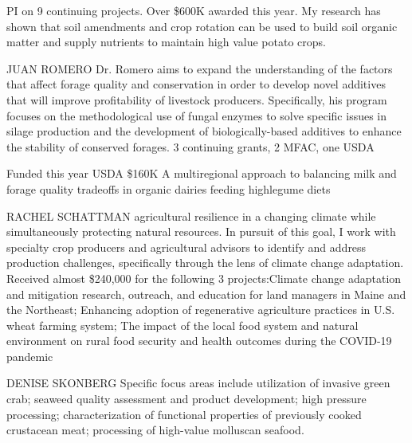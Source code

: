 \documentclass[11pt]{article}
\begin{document}
\begin{description}[topsep=0pt, noitemsep]
\begin{description}[topsep=11pt, noitemsep]
PI on 9 continuing projects. Over \$600K awarded this year. My research has shown that soil amendments and crop rotation can be used to build soil organic matter and supply nutrients to maintain high value potato crops.

JUAN ROMERO Dr. Romero aims to expand the understanding of the factors that affect forage quality and conservation in order to develop novel additives that will improve profitability of livestock producers. Specifically, his program focuses on the methodological use of fungal enzymes to solve specific issues in silage production and the development of biologically-based additives to enhance the stability of conserved forages.
3 continuing grants, 2 MFAC, one USDA

Funded this year USDA \$160K A multiregional approach to balancing milk and forage quality tradeoffs in organic dairies feeding highlegume diets

RACHEL SCHATTMAN agricultural resilience in a changing climate while simultaneously protecting natural resources. In pursuit of this goal, I work with specialty crop producers and agricultural advisors to identify and address production challenges, specifically through the lens of climate change adaptation. Received almost \$240,000 for the following 3 projects:Climate change adaptation and mitigation research, outreach, and education for land managers in Maine and the Northeast; Enhancing adoption of regenerative agriculture practices in U.S. wheat farming system; The impact of the local food system and natural environment on rural food security and health outcomes during the COVID-19 pandemic

DENISE SKONBERG Specific focus areas include utilization of invasive green crab; seaweed quality assessment and product development; high pressure processing; characterization of functional properties of previously cooked crustacean meat; processing of high-value molluscan seafood.


\end{description}
\end{description}
\end{document}
